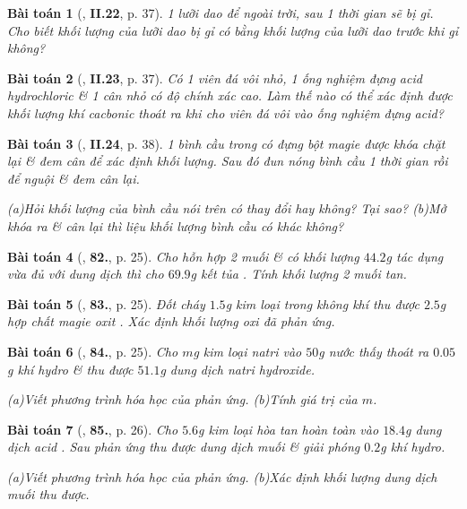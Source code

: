 \documentclass{article}
\numberwithin{equation}{section}
\newtheorem{baitoan}{Bài toán}
\begin{document}
\begin{baitoan}[\cite{Truong_BTNC_Hoa_Hoc_8_2022}, \textbf{II.22}, p. 37]
	1 lưỡi dao để ngoài trời, sau 1 thời gian sẽ bị gỉ. Cho biết khối lượng của lưỡi dao bị gỉ có bằng khối lượng của lưỡi dao trước khi gỉ không?
\end{baitoan}

\begin{baitoan}[\cite{Truong_BTNC_Hoa_Hoc_8_2022}, \textbf{II.23}, p. 37]
	Có 1 viên đá vôi nhỏ, 1 ống nghiệm đựng acid hydrochloric \& 1 cân nhỏ có độ chính xác cao. Làm thế nào có thể xác định được khối lượng khí cacbonic thoát ra khi cho viên đá vôi vào ống nghiệm đựng acid?
\end{baitoan}

\begin{baitoan}[\cite{Truong_BTNC_Hoa_Hoc_8_2022}, \textbf{II.24}, p. 38]
	1 bình cầu trong có đựng bột magie được khóa chặt lại \& đem cân để xác định khối lượng. Sau đó đun nóng bình cầu 1 thời gian rồi để nguội \& đem cân lại.
	
		(a)Hỏi khối lượng của bình cầu nói trên có thay đổi hay không? Tại sao?
		(b)Mở khóa ra \& cân lại thì liệu khối lượng bình cầu có khác không?
	
\end{baitoan}

\begin{baitoan}[\cite{An2011}, \textbf{82.}, p. 25]
	Cho hỗn hợp 2 muối  \&  có khối lượng $44.2$g tác dụng vừa đủ với dung dịch  thì cho $69.9$g kết tủa . Tính khối lượng 2 muối tan.
\end{baitoan}

\begin{baitoan}[\cite{An2011}, \textbf{83.}, p. 25]
	Đốt cháy $1.5$g kim loại  trong không khí thu được $2.5$g hợp chất magie oxit . Xác định khối lượng oxi đã phản ứng.
\end{baitoan}

\begin{baitoan}[\cite{An2011}, \textbf{84.}, p. 25]
	Cho $m$g kim loại natri vào $50$g nước thấy thoát ra $0.05$g khí hydro \& thu được $51.1$g dung dịch natri hydroxide.
	
		(a)Viết phương trình hóa học của phản ứng.
		(b)Tính giá trị của $m$.
	
\end{baitoan}

\begin{baitoan}[\cite{An2011}, \textbf{85.}, p. 26]
	Cho $5.6$g kim loại  hòa tan hoàn  toàn vào $18.4$g dung dịch acid . Sau phản ứng thu được dung dịch muối  \& giải phóng $0.2$g khí hydro.
	
		(a)Viết phương trình hóa học của phản ứng.
		(b)Xác định khối lượng dung dịch muối  thu được.
	
\end{baitoan}
\end{document}
